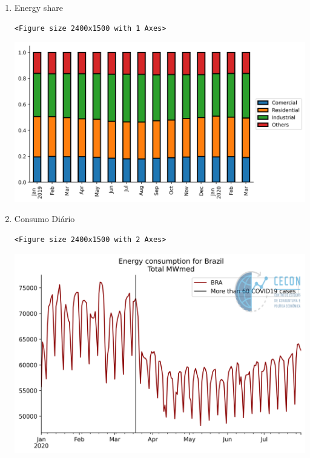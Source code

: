 \documentclass[11pt]{article}
\begin{document}
\begin{enumerate}
\item Energy share
\label{sec:org2515006}

\begin{verbatim}
<Figure size 2400x1500 with 1 Axes>
\end{verbatim}


\begin{center}
\includegraphics[width=.9\linewidth]{obipy-resources/62e383af79e91b63c7fc98dd7fb55b3c3ececcb9/b9bb93431770d5b32665b50dc4549f5f948c88a6.png}
\end{center}

\item Consumo Diário
\label{sec:orgef38e03}

\begin{verbatim}
<Figure size 2400x1500 with 2 Axes>
\end{verbatim}


\begin{center}
\includegraphics[width=.9\linewidth]{obipy-resources/62e383af79e91b63c7fc98dd7fb55b3c3ececcb9/77baa432ba2f44632060c841842355fcb8b83c23.png}
\end{center}


\end{enumerate}
\end{document}
